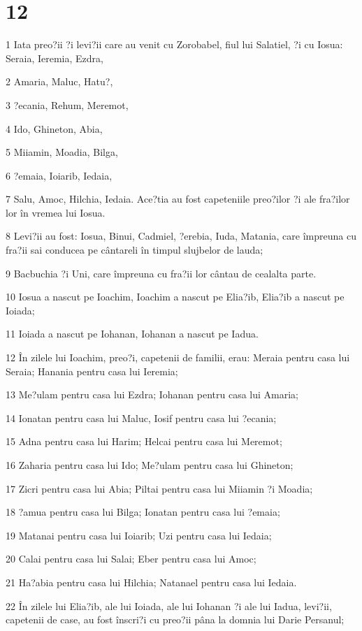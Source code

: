 \chapter{12}

\par 1 Iata preo?ii ?i levi?ii care au venit cu Zorobabel, fiul lui Salatiel, ?i cu Iosua: Seraia, Ieremia, Ezdra,
\par 2 Amaria, Maluc, Hatu?,
\par 3 ?ecania, Rehum, Meremot,
\par 4 Ido, Ghineton, Abia,
\par 5 Miiamin, Moadia, Bilga,
\par 6 ?emaia, Ioiarib, Iedaia,
\par 7 Salu, Amoc, Hilchia, Iedaia. Ace?tia au fost capeteniile preo?ilor ?i ale fra?ilor lor în vremea lui Iosua.
\par 8 Levi?ii au fost: Iosua, Binui, Cadmiel, ?erebia, Iuda, Matania, care împreuna cu fra?ii sai conducea pe cântareli în timpul slujbelor de lauda;
\par 9 Bacbuchia ?i Uni, care împreuna cu fra?ii lor cântau de cealalta parte.
\par 10 Iosua a nascut pe Ioachim, Ioachim a nascut pe Elia?ib, Elia?ib a nascut pe Ioiada;
\par 11 Ioiada a nascut pe Iohanan, Iohanan a nascut pe Iadua.
\par 12 În zilele lui Ioachim, preo?i, capetenii de familii, erau: Meraia pentru casa lui Seraia; Hanania pentru casa lui Ieremia;
\par 13 Me?ulam pentru casa lui Ezdra; Iohanan pentru casa lui Amaria;
\par 14 Ionatan pentru casa lui Maluc, Iosif pentru casa lui ?ecania;
\par 15 Adna pentru casa lui Harim; Helcai pentru casa lui Meremot;
\par 16 Zaharia pentru casa lui Ido; Me?ulam pentru casa lui Ghineton;
\par 17 Zicri pentru casa lui Abia; Piltai pentru casa lui Miiamin ?i Moadia;
\par 18 ?amua pentru casa lui Bilga; Ionatan pentru casa lui ?emaia;
\par 19 Matanai pentru casa lui Ioiarib; Uzi pentru casa lui Iedaia;
\par 20 Calai pentru casa lui Salai; Eber pentru casa lui Amoc;
\par 21 Ha?abia pentru casa lui Hilchia; Natanael pentru casa lui Iedaia.
\par 22 În zilele lui Elia?ib, ale lui Ioiada, ale lui Iohanan ?i ale lui Iadua, levi?ii, capetenii de case, au fost înscri?i cu preo?ii pâna la domnia lui Darie Persanul;
